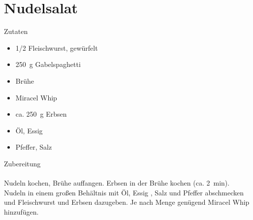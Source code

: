 \section*{Nudelsalat}
\ihead{}\ohead{}
\cfoot{}
{\Large Zutaten}
\begin{multicols}{2}
\begin{itemize}
    \item \num{1/2} Fleischwurst, gewürfelt
    \item \SI{250}{g} Gabelspaghetti
    \item Brühe
    \item Miracel Whip
    \item ca. \SI{250}{g} Erbsen
    \item Öl, Essig
    \item Pfeffer, Salz
\end{itemize}
\end{multicols}
\noindent
{\Large Zubereitung}\\
\\
Nudeln kochen, Brühe auffangen. 
Erbsen in der Brühe kochen (ca. \SI{2}{min}).
Nudeln in einem großen Behältnis mit Öl, Essig , Salz und Pfeffer abschmecken und Fleischwurst und Erbsen dazugeben.
Je nach Menge genügend Miracel Whip hinzufügen.
